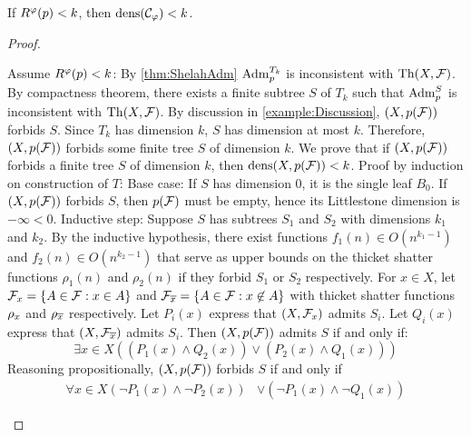 \begin{theorem}
\label{lem:finiteTreeForbidden}
    If $R^\varphi(p) < k$, then $\operatorname{dens}(\mathcal{C}_\varphi) < k$.
\end{theorem}
\begin{proof}
\begin{outline}
\0 Assume $R^\varphi(p) < k$:
    \1 By \cref{thm:ShelahAdm} $\operatorname{Adm}^{T_{k}}_{p}$ is inconsistent with $\operatorname{Th}(X,\mathcal{F})$. By compactness theorem, there exists a finite subtree $S$ of $T_k$ such that $\operatorname{Adm}^{S}_{p}$ is inconsistent with $\operatorname{Th}(X,\mathcal{F})$. By discussion in \cref{example:Discussion}, $(X,p(\mathcal{F}))$ forbids $S$. Since $T_k$ has dimension $k$, $S$ has dimension at most $k$. Therefore, $(X,p(\mathcal{F}))$ forbids some finite tree $S$ of dimension $k$.
\0 We prove that if $(X,p(\mathcal{F}))$ forbids a finite tree $S$ of dimension $k$, then $\operatorname{dens}(X,p(\mathcal{F}))<k$. Proof by induction on construction of $T$: 
    \1 Base case: If $S$ has dimension 0, it is the single leaf $B_0$. If $(X,p(\mathcal{F}))$ forbids $S$, then $p(\mathcal{F})$ must be empty, hence its Littlestone dimension is $-\infty < 0$.
    \1 Inductive step: Suppose $S$ has subtrees $S_1$ and $S_2$ with dimensions $k_1$ and $k_2$. By the inductive hypothesis, there exist functions $f_1(n)\in O(n^{k_1-1})$ and $f_2(n)\in O(n^{k_2-1})$ that serve as upper bounds on the thicket shatter functions $\rho_1(n)$ and $\rho_2(n)$ if they forbid $S_1$ or $S_2$ respectively.
        \2 For $x\in X$, let $\mathcal{F}_x = \{A\in\mathcal{F} : x\in A\}$ and $\mathcal{F}_{\overline{x}} = \{A\in\mathcal{F} : x\not\in A\}$ with thicket shatter functions $\rho_x$ and $\rho_{\overline{x}}$ respectively.
            \marginnote[0cm]{$\rhox, \rhoNotx$}
            \3 Let $P_i(x)$ express that $(X,\mathcal{F}_x)$ admits $S_i$. 
            \3 Let $Q_i(x)$ express that $(X,\mathcal{F}_{\overline{x}})$ admits $S_i$. 
        \2 Then $(X,p(\mathcal{F}))$ admits $S$ if and only if:
        $$\exists x\in X 
        \left(
        \left(P_1(x)\land Q_2(x)\right)
        \lor
        \left(P_2(x)\land Q_1(x)\right)
        \right)
        $$
        \2 Reasoning propositionally, $(X,p(\mathcal{F}))$ forbids $S$ if and only if 
        \begin{align*}
            \forall x\in X 
            (\lnot P_1(x)\land\lnot P_2(x))
            & \lor
            (\lnot P_1(x)\land\lnot Q_1(x))

\end{align*}
\end{outline}
\end{proof}
